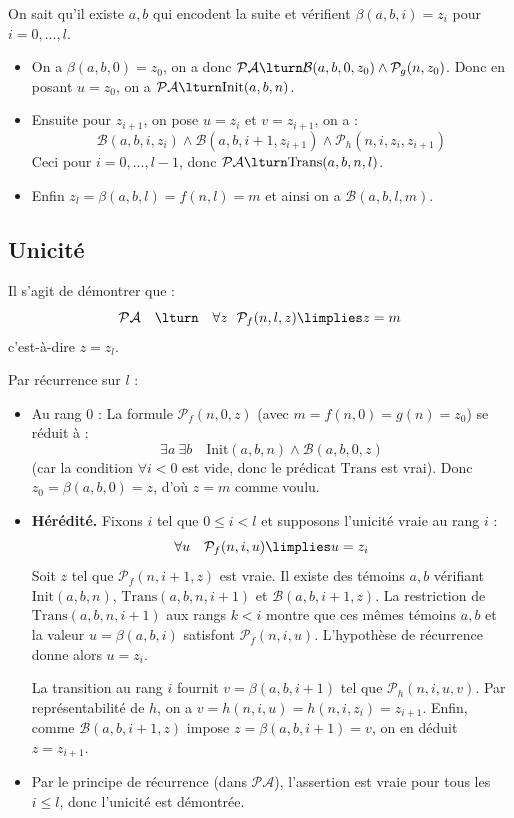 \documentclass[11pt,class=report,crop=false]{standalone}
\begin{document}
On sait qu'il existe $a,b$ qui encodent la suite et vérifient $\beta(a,b,i) = z_i$ pour $i=0,\dots,l$.
\begin{itemize}
    \item On a $\beta(a,b,0) = z_0$, on a donc $\mathcal{PA} \lturn \mathcal{B}(a,b,0,z_0) \land \mathcal{P}_g(n,z_0)$. Donc en posant $u = z_0$, on a $\mathcal{PA} \lturn \text{Init}(a,b,n)$.

    \item Ensuite pour $z_{i+1}$, on pose $u = z_i$ et $v = z_{i+1}$, on a :
\[ \mathcal{B}(a,b,i,z_i) \land \mathcal{B}(a,b,i+1,z_{i+1}) \land \mathcal{P}_h(n,i,z_i,z_{i+1}) \]
Ceci pour $i = 0, \dots, l-1$, donc $\mathcal{PA} \lturn \text{Trans}(a,b,n,l)$.

    \item Enfin $z_l = \beta(a,b,l) = f(n,l) = m$ et ainsi on a $\mathcal{B}(a,b,l,m)$.
\end{itemize}

\subsection{Unicité}

Il s'agit de démontrer que :
\[ \mathcal{PA} \quad \lturn \quad \forall z \ \ \mathcal{P}_f(n,l,z) \limplies z = m \]
c'est-à-dire $z = z_l$.

Par récurrence sur $l$ :
\begin{itemize}
    \item Au rang $0$ : 
    La formule $\mathcal{P}_f(n,0,z)$ (avec $m=f(n,0)=g(n)=z_0$) se réduit à :
    \[ \exists a \ \exists b \quad \text{Init}(a,b,n) \land \mathcal{B}(a,b,0,z) \]
    (car la condition \og{}$\forall i < 0$\fg{} est vide, donc le prédicat $\text{Trans}$ est vrai).
    Donc $z_0 = \beta(a,b,0) = z$, d'où $z = m$ comme voulu.
    
    \item \textbf{Hérédité.} Fixons $i$ tel que $0 \le i < l$ et supposons l'unicité vraie au rang $i$ :
    \[ \forall u \quad \mathcal{P}_f(n,i,u) \limplies u = z_i \]
    Soit $z$ tel que $\mathcal{P}_f(n,i+1,z)$ est vraie. Il existe des témoins $a,b$ vérifiant $\text{Init}(a,b,n)$, $\text{Trans}(a,b,n,i+1)$ et $\mathcal{B}(a,b,i+1,z)$. 
    La restriction de $\text{Trans}(a,b,n,i+1)$ aux rangs $k < i$ montre que ces mêmes témoins $a,b$ et la valeur $u = \beta(a,b,i)$ satisfont $\mathcal{P}_f(n,i,u)$. L'hypothèse de récurrence donne alors $u = z_i$.

    La transition au rang $i$ fournit $v = \beta(a,b,i+1)$ tel que $\mathcal{P}_h(n,i,u,v)$. Par représentabilité de $h$, on a $v = h(n,i,u) = h(n,i,z_i) = z_{i+1}$.
    Enfin, comme $\mathcal{B}(a,b,i+1,z)$ impose $z = \beta(a,b,i+1) = v$, on en déduit $z = z_{i+1}$.

    \item Par le principe de récurrence (dans $\mathcal{PA}$), l'assertion est vraie pour tous les $i \le l$, donc l'unicité est démontrée.
\end{itemize}
\end{document}
